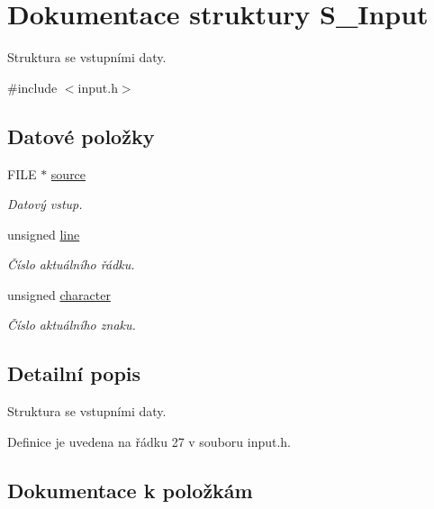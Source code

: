 \hypertarget{struct_s___input}{}\section{Dokumentace struktury S\+\_\+\+Input}
\label{struct_s___input}


Struktura se vstupními daty.  




{\ttfamily \#include $<$input.\+h$>$}

\subsection*{Datové položky}
\begin{DoxyCompactItemize}
\item 
F\+I\+LE $\ast$ \hyperlink{struct_s___input_a0c4aa150664a3347db13aeeb47811829}{source}
\begin{DoxyCompactList}\small\item\em Datový vstup. \end{DoxyCompactList}\item 
unsigned \hyperlink{struct_s___input_a05ef0c4dbeec4fc8ccb225de9c26d896}{line}
\begin{DoxyCompactList}\small\item\em Číslo aktuálního řádku. \end{DoxyCompactList}\item 
unsigned \hyperlink{struct_s___input_a2d5947baa843f789d532d44eaff8d39f}{character}
\begin{DoxyCompactList}\small\item\em Číslo aktuálního znaku. \end{DoxyCompactList}\end{DoxyCompactItemize}


\subsection{Detailní popis}
Struktura se vstupními daty. 

Definice je uvedena na řádku 27 v souboru input.\+h.



\subsection{Dokumentace k položkám}
\mbox{\label{struct_s___input_a2d5947baa843f789d532d44eaff8d39f}} 
